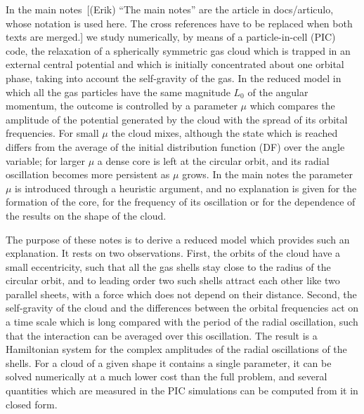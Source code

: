 \documentclass[prd,aps,nofootinbib,superscriptaddress,amsmath,amssymb]{revtex4}
\newcommand{\EJ}[1]{{\color{red}~\textsf{[(Erik) #1]}}}
\begin{document}
In the main notes\EJ{``The main notes'' are the article in docs/articulo, whose notation is used here. The cross references have to be replaced when both texts are merged.} we study numerically, by means of a particle-in-cell (PIC) code, the relaxation of a spherically symmetric gas cloud which is trapped in an external central potential and which is initially concentrated about one orbital phase, taking into account the self-gravity of the gas. In the reduced model in which all the gas particles have the same magnitude $L_0$ of the angular momentum, the outcome is controlled by a parameter $\mu$ which compares the amplitude of the potential generated by the cloud with the spread of its orbital frequencies. For small $\mu$ the cloud mixes, although the state which is reached differs from the average of the initial distribution function (DF) over the angle variable; for larger $\mu$ a dense core is left at the circular orbit, and its radial oscillation becomes more persistent as $\mu$ grows. In the main notes the parameter $\mu$ is introduced through a heuristic argument, and no explanation is given for the formation of the core, for the frequency of its oscillation or for the dependence of the results on the shape of the cloud.

The purpose of these notes is to derive a reduced model which provides such an explanation. It rests on two observations. First, the orbits of the cloud have a small eccentricity, such that all the gas shells stay close to the radius of the circular orbit, and to leading order two such shells attract each other like two parallel sheets, with a force which does not depend on their distance. Second, the self-gravity of the cloud and the differences between the orbital frequencies act on a time scale which is long compared with the period of the radial oscillation, such that the interaction can be averaged over this oscillation. The result is a Hamiltonian system for the complex amplitudes of the radial oscillations of the shells. For a cloud of a given shape it contains a single parameter, it can be solved numerically at a much lower cost than the full problem, and several quantities which are measured in the PIC simulations can be computed from it in closed form.
\end{document}
